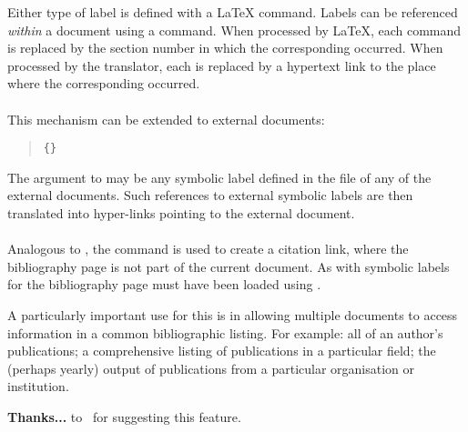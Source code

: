 Either type of label is defined with a \LaTeX{}  command.  
Labels can be referenced \textit{within} a document using a  command.
When processed by \LaTeX, each  command is replaced by the 
section number in which the corresponding  occurred.
When processed by the translator, each  is replaced by 
a hypertext link to the place where the corresponding  occurred.%
 

%
%
\paragraph*{\label{externref}}
This mechanism can be extended to external documents:
\begin{quote}
\begin{small}
\verb|{|\verb|}|
\end{small}
\end{quote}
The argument to  may be any symbolic label defined 
in the  file of any of the external documents.
Such references to external symbolic labels are then translated
into hyper-links pointing to the external document.%


%
%
\paragraph*{\label{externcite}}
%
Analogous to ,
the  command is used to create a citation link,
where the bibliography page is not part of the current document.
As with  symbolic labels for the bibliography page
must have been loaded using 
.

A particularly important use for this is in allowing multiple documents 
to access information in a common bibliographic listing.
For example: all of an author's publications; 
a comprehensive listing of publications in a particular field; 
the (perhaps yearly) output of publications 
from a particular organisation or institution.

\medskip\noindent
\textbf{Thanks...} to \Engberg\ for suggesting this feature.

